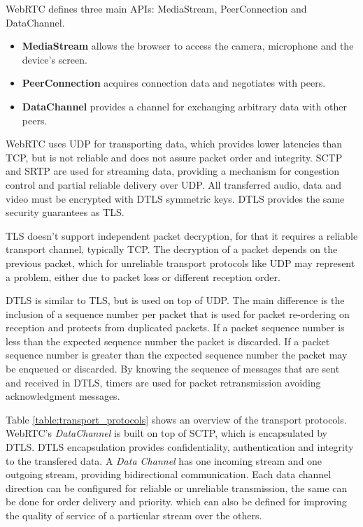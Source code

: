 \ac{WebRTC} defines three main \ac{API}s: MediaStream, PeerConnection and DataChannel. 

\begin{itemize}
  \item \textbf{MediaStream} allows the browser to access the camera, microphone and the device's screen. 

  \item \textbf{PeerConnection} acquires connection data and negotiates with peers.
  \item \textbf{DataChannel} provides a channel for exchanging arbitrary data with other peers.
\end{itemize}

\ac{WebRTC} uses \ac{UDP} for transporting data, which provides lower latencies than \ac{TCP}, but is not reliable and does not assure packet order and integrity. \ac{SCTP} and \ac{SRTP} are used for streaming data, providing a mechanism for congestion control and partial reliable delivery over \ac{UDP}. All transferred audio, data and video must be encrypted with \ac{DTLS} symmetric keys. \ac{DTLS} provides the same security guarantees as \ac{TLS}. 

\ac{TLS} doesn't support independent packet decryption\cite{rfc6347}, for that it requires a reliable transport channel, typically \ac{TCP}. The decryption of a packet depends on the previous packet, which for unreliable transport protocols like \ac{UDP} may represent a problem, either due to packet loss or different reception order.

\ac{DTLS} is similar to \ac{TLS}, but is used on top of \ac{UDP}.
The main difference is the inclusion of a sequence number per packet that is used for packet re-ordering on reception and protects from duplicated packets. If a packet sequence number is less than the expected sequence number the packet is discarded. If a packet sequence number is greater than the expected sequence number the packet may be enqueued or discarded. By knowing the sequence of messages that are sent and received in \ac{DTLS}, timers are used for packet retransmission avoiding acknowledgment messages.

{\color{blue} Table \ref{table:transport_protocols} shows an overview of the transport protocols.}
\ac{WebRTC}'s \emph{DataChannel} is built on top of \ac{SCTP}, which is encapsulated by \ac{DTLS}. \ac{DTLS} encapsulation provides confidentiality, authentication and integrity to the transfered data. A \emph{Data Channel} has one incoming stream and one outgoing stream, providing bidirectional communication. Each data channel direction can be configured for reliable or unreliable transmission, the same can be done for order delivery and priority. which can also be defined for improving the quality of service of a particular stream over the others.

